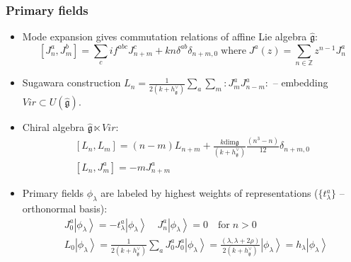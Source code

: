 \documentclass[pdftex]{beamer}
\newcommand{\gf}{\mathfrak{g}}
\newcommand{\gfh}{\hat{\mathfrak{g}}}
\theoremstyle{definition} \newtheorem{Def}{Definition}
\begin{document}
\begin{frame}
  \frametitle{Primary fields}
  \begin{itemize}
  \item Mode expansion gives commutation relations of affine Lie algebra $\gfh$: 
    \begin{equation*}
      \left[J^a_n,J^b_m\right]=\sum_c i f^{abc}J^c_{n+m}+kn\delta^{ab}\delta_{n+m,0} \; \text{where} \;           J^a(z)=\sum\limits_{n\in \mathbb Z}z^{n-1}J^a_n 
    \end{equation*}
  \item Sugawara construction $  L_n=\frac{1}{2(k+h^{\vee}_{\gf})}\sum\limits_a\sum\limits_m:J^a_m J^a_{n-m}:$ -- embedding $Vir\subset U(\gfh)$.
  \item Chiral algebra $\gfh \ltimes Vir$:
    \begin{equation*}
      \label{eq:92}
      \begin{aligned}
        \left[L_n,L_m\right]=(n-m)L_{n+m}+\frac{k\mathrm{dim}\gf}{(k+h^{\vee}_{\gf})}\frac{(n^3-n)}{12}\delta_{n+m,0}\\
        \left[L_n,J^a_m\right]=-mJ^a_{n+m}
      \end{aligned}
    \end{equation*}

  \item Primary fields $\phi_{\lambda}$ are labeled by highest weights of representations
    ($\{t^{a}_{\lambda}\}$ --orthonormal basis):
    \begin{equation*}
      \begin{aligned}
        & J_0^a\left|\phi_{\lambda}\right>=-t^a_{\lambda}\left|\phi_{\lambda}\right>  \quad    J^a_n\left|\phi_{\lambda}\right>=0 \quad \mbox{for}\; n>0 \\
        & L_0\left|\phi_{\lambda}\right>=\frac{1}{2(k+h^{\vee}_{\gf})}\sum_aJ^a_0J^a_0\left|\phi_{\lambda}\right>=\frac{(\lambda,\lambda+2\rho)}{2(k+h^{\vee}_{\gf})}\left|\phi_{\lambda}\right>=h_{\lambda} \left|\phi_{\lambda}\right>
      \end{aligned}
    \end{equation*}
  \end{itemize}
\end{frame}
\end{document}
